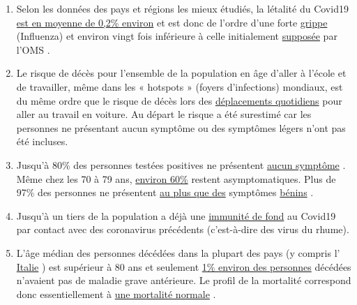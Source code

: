 \begin{enumerate}
\def\labelenumi{\arabic{enumi}.}
\tightlist
\item
  Selon les données des pays et régions les mieux étudiés, la létalité
  du Covid19 \href{https://swprs.org/studies-on-covid-19-lethality/}{est
  en moyenne de 0,2\% environ} et est donc de l'ordre d'une forte
  \href{https://www.ebm-netzwerk.de/en/publications/covid-19}{grippe}
  (Influenza) et environ vingt fois inférieure à celle initialement
  \href{https://www.businessinsider.com/coronavirus-death-rate-by-age-countries-2020-3}{supposée}
  par l'OMS .
\item
  Le risque de décès pour l'ensemble de la population en âge d'aller à
  l'école et de travailler, même dans les « hotspots » (foyers
  d'infections) mondiaux, est du même ordre que le risque de décès lors
  des
  \href{https://www.medrxiv.org/content/10.1101/2020.04.05.20054361v1}{déplacements
  quotidiens} pour aller au travail en voiture. Au départ le risque a
  été surestimé car les personnes ne présentant aucun symptôme ou des
  symptômes légers n'ont pas été incluses.
\item
  Jusqu'à 80\% des personnes testées positives ne présentent
  \href{https://www.bmj.com/content/369/bmj.m1375}{aucun symptôme} .
  Même chez les 70 à 79 ans,
  \href{https://www.niid.go.jp/niid/en/2019-ncov-e/9407-covid-dp-fe-01.html}{environ
  60\%} restent asymptomatiques. Plus de 97\% des personnes ne
  présentent
  \href{https://swprs.org/studies-on-covid-19-lethality/\#hospitalizations}{au
  plus que des} symptômes
  \href{https://swprs.org/studies-on-covid-19-lethality/\#hospitalizations}{bénins}
  .
\item
  Jusqu'à un tiers de la population a déjà une
  \href{https://www.medrxiv.org/content/10.1101/2020.04.17.20061440v1}{immunité
  de fond} au Covid19 par contact avec des coronavirus précédents
  (c'est-à-dire des virus du rhume).
\item
  L'âge médian des personnes décédées dans la plupart des pays (y
  compris l'
  \href{https://www.epicentro.iss.it/coronavirus/sars-cov-2-decessi-italia}{Italie}
  ) est supérieur à 80 ans et seulement
  \href{https://www.bloomberg.com/news/articles/2020-03-18/99-of-those-who-died-from-virus-had-other-illness-italy-says}{1\%
  environ des personnes} décédées n'avaient pas de maladie grave
  antérieure. Le profil de la mortalité correspond donc essentiellement
  à
  \href{https://www.vienna.at/analyse-zeigt-covid-19-opferkurve-entspricht-normaler-mortalitaet/6581246}{une
  mortalité normale} .

\end{enumerate}
